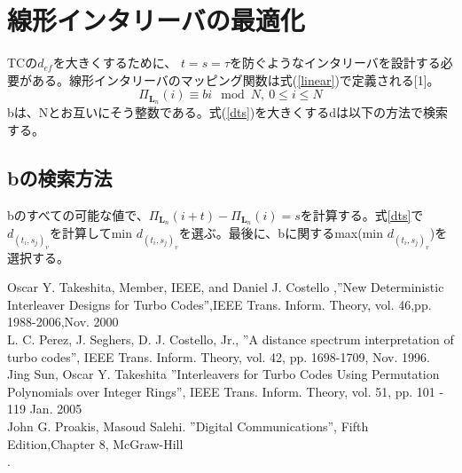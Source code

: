 \documentclass[twoside]{jarticle}
\begin{document}
\section{線形インタリーバの最適化}



TCの$d_{ef}$を大きくするために、
$t = s =\tau$を防ぐようなインタリーバを設計する必要がある。線形インタリーバのマッピング関数は式(\ref{linear})で定義される[1]。
\begin{equation}
\Pi_{\mathbf{L}_n}(i) \equiv bi  \mod N, \ 0 \leq i \leq N
\label{linear}
\end{equation}
bは、Nとお互いにそう整数である。式(\ref{dts})を大きくするdは以下の方法で検索する。


\subsection{bの検索方法}
bのすべての可能な値で、$\Pi_{\mathbf{L}_n}(i+t)-\Pi_{\mathbf{L}_n}(i)=s$を計算する。式\ref{dts}で$d_{(t_i,s_j)_v}$を計算してmin $d_{(t_i,s_j)_v}$を選ぶ。最後に、bに関するmax(min $d_{(t_i,s_j)_v}$)を選択する。
\vspace{-3mm}
\begin{thebibliography}{}
    Oscar Y. Takeshita, Member, IEEE, and Daniel J. Costello ,''New Deterministic Interleaver Designs for Turbo Codes'',IEEE Trans. Inform. Theory, vol. 46,pp. 1988-2006,Nov. 2000\\
   L. C. Perez, J. Seghers, D. J. Costello, Jr., ''A distance spectrum interpretation of turbo codes'', IEEE Trans. Inform. Theory, vol. 42, pp. 1698-1709, Nov. 1996.\\
 Jing Sun, Oscar Y. Takeshita ”Interleavers for Turbo Codes Using Permutation Polynomials over Integer Rings”, IEEE Trans. Inform. Theory, vol. 51,
pp. 101 - 119 Jan. 2005\\
 John G. Proakis, Masoud Salehi. ''Digital Communications'', Fifth Edition,Chapter 8, McGraw-Hill\\.
\end{thebibliography}
\end{document}
